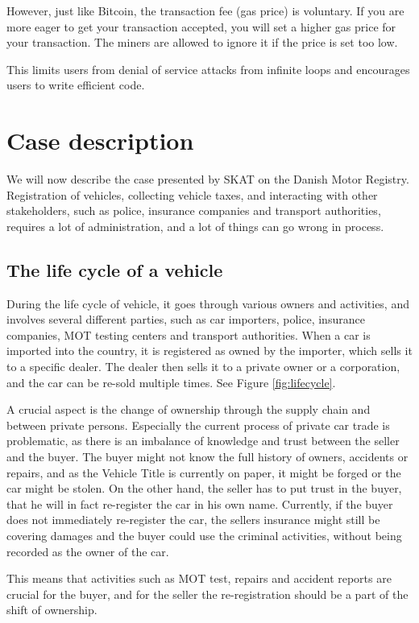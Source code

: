 \documentclass[oneside,a4paper,10pts,article]{memoir}
\begin{document}
However, just like Bitcoin, the transaction fee (gas price) is
voluntary. If you are more eager to get your transaction accepted, you
will set a higher gas price for your transaction. The miners are
allowed to ignore it if the price is set too low.

This limits users from denial of service attacks from infinite loops
and encourages users to write efficient code.

\newpage
\chapter{Case description}
\label{sec:case}
We will now describe the case presented by SKAT on the Danish Motor
Registry. Registration of vehicles, collecting vehicle taxes, and
interacting with other stakeholders, such as police, insurance
companies and transport authorities, requires a lot of administration,
and a lot of things can go wrong in process.

\section{The life cycle of a vehicle}
During the life cycle of vehicle, it goes through various owners and
activities, and involves several different parties, such as car
importers, police, insurance companies, MOT testing centers and
transport authorities. When a car is imported into the country, it is
registered as owned by the importer, which sells it to a specific
dealer. The dealer then sells it to a private owner or a corporation,
and the car can be re-sold multiple times. See Figure \ref{fig:lifecycle}.

A crucial aspect is the change of ownership through the supply chain
and between private persons. Especially the current process of private
car trade is problematic, as there is an imbalance of knowledge and
trust between the seller and the buyer. The buyer might not know the
full history of owners, accidents or repairs, and as the Vehicle Title
is currently on paper, it might be forged or the car might be
stolen. On the other hand, the seller has to put trust in the buyer,
that he will in fact re-register the car in his own name. Currently,
if the buyer does not immediately re-register the car, the sellers
insurance might still be covering damages and the buyer could use the
criminal activities, without being recorded as the owner of the car.

This means that activities such as MOT test, repairs and accident
reports are crucial for the buyer, and for the seller the
re-registration should be a part of the shift of ownership.
\end{document}
